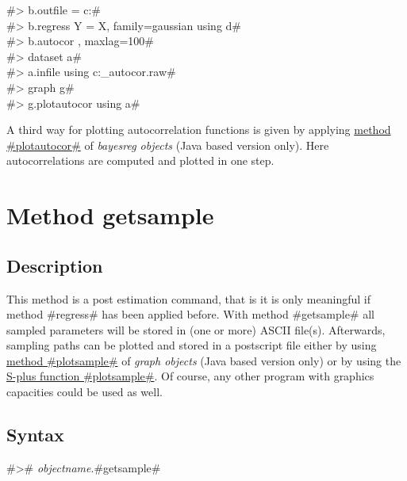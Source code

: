 #> b.outfile = c:\data{}# \\
#> b.regress Y = X, family=gaussian using d# \\
#> b.autocor , maxlag=100# \\
#> dataset a# \\
#> a.infile using c:\data{}_autocor.raw# \\
#> graph g# \\
#> g.plotautocor using a#

A third way for plotting autocorrelation functions is given by
applying \hyperref[bayesregplotautocor]{method #plotautocor#} of
{\em bayesreg objects} (Java based version only). Here
autocorrelations are computed and plotted in one step.

\section{Method getsample}
\label{bayesgetsample} 


\subsection*{Description}

This method is a post estimation command, that is it is only
meaningful if method #regress# has been applied before. With
method #getsample# all sampled parameters will be stored in (one
or more) ASCII file(s). Afterwards, sampling paths can be plotted
and stored in a postscript file either by using
\hyperref[graphplotsample]{method #plotsample#} of {\em graph
objects} (Java based version only) or by using the
\hyperref[splusplotsample]{S-plus function #plotsample#}. Of
course, any other program with graphics capacities could be used
as well.


\subsection*{Syntax}

#># {\em objectname}.#getsample#

